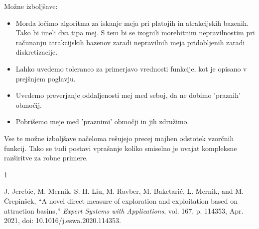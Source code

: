 \documentclass[12pt,a4paper]{article}
\begin{document}
    
    Možne izboljšave:
    \begin{itemize}
        \item Morda ločimo algoritma za iskanje meja pri platojih in atrakcijskih bazenih. Tako bi imeli dva tipa mej. S tem bi se izognili morebitnim nepravilnostim pri računanju atrakcijskih bazenov zaradi nepravilnih meja pridobljenih zaradi diskretizacije.
        \item Lahko uvedemo toleranco za primerjavo vrednosti funkcije, kot je opisano v prejšnjem poglavju.
        \item Uvedemo preverjanje oddaljenosti mej med seboj, da ne dobimo 'praznih' območij.
        \item Pobrišemo meje med 'praznimi' območji in jih združimo.
    \end{itemize}
    
    Vse te možne izboljšave načeloma rešujejo precej majhen odstotek vzorčnih funkcij. Tako se tudi postavi vprašanje koliko smiselno je uvajat kompleksne razširitve za robne primere.
    
    \begin{thebibliography}{1}
        
        J. Jerebic, M. Mernik, S.-H. Liu, M. Ravber, M. Baketarić, L. Mernik, and M. Črepinšek, ``A novel direct measure of exploration and exploitation based on attraction basins,'' \emph{Expert Systems with Applications}, vol. 167, p. 114353, Apr. 2021, doi: 10.1016/j.eswa.2020.114353.
        
    \end{thebibliography}
    
\end{document}
